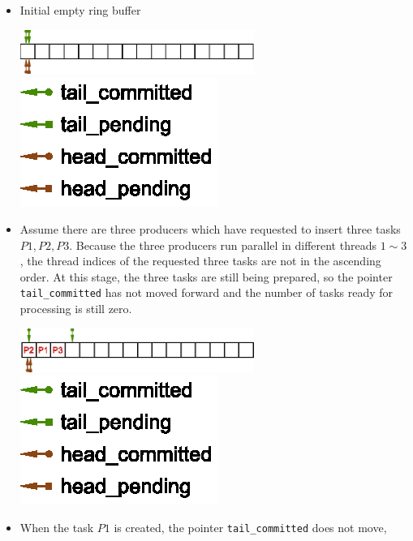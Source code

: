 \documentclass[11pt, a4paper]{article}
\begin{document}
\begin{itemize}
\item Initial empty ring buffer
  \begin{center}
    \includegraphics[width=0.6\textwidth,
    keepaspectratio]{figures/2023-05-10-ring-buffer-initial-empty}
    \includegraphics{figures/2023-05-10-ring-buffer-pointer-symbols}
  \end{center}
\item Assume there are three producers which have requested to insert three tasks
  $P1, P2, P3$. Because the three producers run parallel in different threads $1 \sim 3$,
  the thread indices of the requested three tasks are not in the ascending order. At this
  stage, the three tasks are still being prepared, so the pointer \texttt{tail\_committed}
  has not moved forward and the number of tasks ready for processing is still zero.
  \begin{center}
    \includegraphics[width=0.6\textwidth,
    keepaspectratio]{figures/2023-05-10-ring-buffer-add-three-tasks}
    \includegraphics{figures/2023-05-10-ring-buffer-pointer-symbols}
  \end{center}
\item When the task $P1$ is created, the pointer \texttt{tail\_committed} does not move,

\end{itemize}
\end{document}
